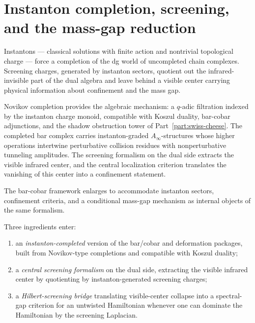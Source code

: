 \chapter{Instanton completion, screening, and the mass-gap reduction}
\label{ch:ym-instanton-screening}


Instantons --- classical solutions with finite action and nontrivial
topological charge --- force a completion of the dg world of
uncompleted chain complexes. Screening charges, generated by instanton
sectors, quotient out the infrared-invisible part of the dual algebra
and leave behind a visible center carrying physical information about
confinement and the mass gap.

Novikov completion provides the algebraic mechanism: a $q$-adic
filtration indexed by the instanton charge monoid, compatible with
Koszul duality, bar-cobar adjunctions, and the shadow obstruction tower
of Part~\ref{part:swiss-cheese}. The completed bar complex carries
instanton-graded $A_\infty$-structures whose higher operations
intertwine perturbative collision residues with nonperturbative
tunneling amplitudes. The screening formalism on the dual side extracts
the visible infrared center, and the central localization criterion
translates the vanishing of this center into a confinement statement.

The bar-cobar framework enlarges to accommodate instanton sectors,
confinement criteria, and a conditional mass-gap mechanism as internal
objects of the same formalism.

Three ingredients enter:
\begin{enumerate}[label=(\roman*)]
\item an \emph{instanton-completed} version of the bar/cobar and
deformation packages, built from Novikov-type completions and
compatible with Koszul duality;
\item a \emph{central screening formalism} on the dual side,
extracting the visible infrared center by quotienting by
instanton-generated screening charges;
\item a \emph{Hilbert-screening bridge} translating visible-center
collapse into a spectral-gap criterion for an untwisted Hamiltonian
whenever one can dominate the Hamiltonian by the screening Laplacian.
\end{enumerate}


